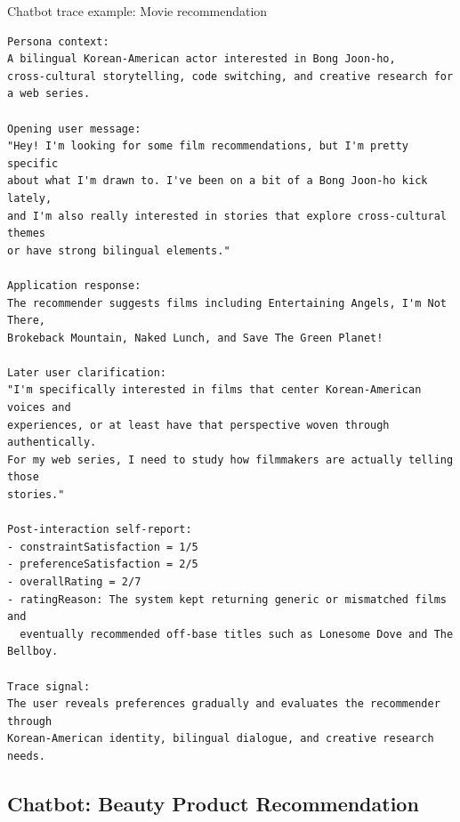 \begin{promptbox}[label={box:trace-movie}]{Chatbot trace example: Movie recommendation}
\begin{lstlisting}
Persona context:
A bilingual Korean-American actor interested in Bong Joon-ho,
cross-cultural storytelling, code switching, and creative research for
a web series.

Opening user message:
"Hey! I'm looking for some film recommendations, but I'm pretty specific
about what I'm drawn to. I've been on a bit of a Bong Joon-ho kick lately,
and I'm also really interested in stories that explore cross-cultural themes
or have strong bilingual elements."

Application response:
The recommender suggests films including Entertaining Angels, I'm Not There,
Brokeback Mountain, Naked Lunch, and Save The Green Planet!

Later user clarification:
"I'm specifically interested in films that center Korean-American voices and
experiences, or at least have that perspective woven through authentically.
For my web series, I need to study how filmmakers are actually telling those
stories."

Post-interaction self-report:
- constraintSatisfaction = 1/5
- preferenceSatisfaction = 2/5
- overallRating = 2/7
- ratingReason: The system kept returning generic or mismatched films and
  eventually recommended off-base titles such as Lonesome Dove and The Bellboy.

Trace signal:
The user reveals preferences gradually and evaluates the recommender through
Korean-American identity, bilingual dialogue, and creative research needs.
\end{lstlisting}
\end{promptbox}

\subsection{Chatbot: Beauty Product Recommendation}
\label{app:beauty-results}

